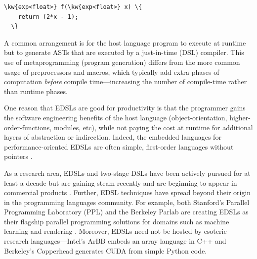 \vspace{1mm}
\begin{Verbatim}[commandchars=\\\{\}]
  \kw{exp<float>} f(\kw{exp<float>} x) \{
    return (2*x - 1);
  \}
\end{Verbatim}

A common arrangement is for the host language program to execute at
runtime but to generate ASTs that are executed by a just-in-time
(DSL) compiler.  This use of metaprogramming (program generation)
differs from the more common usage of preprocessors and 
macros, which typically add extra
phases of computation {\em before}  compile time---increasing
the number of compile-time rather than runtime phases.



One reason that EDSLs are good for productivity is that the programmer
gains the software engineering benefits of the host language
(object-orientation, higher-order-functions, modules, etc), while not
paying the cost at runtime for additional layers of abstraction or
indirection.  Indeed, the embedded languages for 
performance-oriented EDSLs are often simple, first-order
languages without pointers .


As a research area, EDSLs and two-stage DSLs have been actively pursued for at least a
decade  but are gaining steam
recently 
and are beginning to appear in
commercial products .
%
Further, EDSL techniques have spread beyond their origin in 
 the programming languages community.
% 
For example, both Stanford's Parallel Programming Laboratory (PPL) and
the Berkeley Parlab are creating EDSLs as their flagship parallel
programming solutions for domains such as machine learning and
rendering .
  Moreover, EDSLs need not be hosted by esoteric research languages---Intel's
 ArBB embeds an array language in C++ and Berkeley's
Copperhead  generates CUDA from simple Python code.


